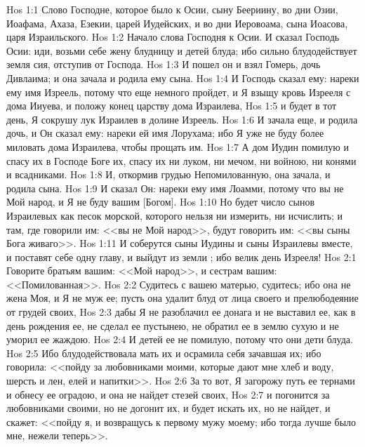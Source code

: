 \vs Hos 1:1 Слово Господне, которое было к Осии, сыну Беериину, во дни Озии, Иоафама, Ахаза, Езекии, царей Иудейских, и во дни Иеровоама, сына Иоасова, царя Израильского.
\rsbpar\vs Hos 1:2 Начало слова Господня к Осии. И сказал Господь Осии: иди, возьми себе жену блудницу и детей блуда; ибо сильно блудодействует земля сия, отступив от Господа.
\vs Hos 1:3 И пошел он и взял Гомерь, дочь Дивлаима; и она зачала и родила ему сына.
\vs Hos 1:4 И Господь сказал ему: нареки ему имя Изреель, потому что еще немного пройдет, и Я взыщу кровь Изрееля с дома Ииуева, и положу конец царству дома Израилева,
\vs Hos 1:5 и будет в тот день, Я сокрушу лук Израилев в долине Изреель.
\vs Hos 1:6 И зачала еще, и родила дочь, и Он сказал ему: нареки ей имя Лорухама; ибо Я уже не буду более миловать дома Израилева, чтобы прощать им.
\vs Hos 1:7 А дом Иудин помилую и спасу их в Господе Боге их, спасу их ни луком, ни мечом, ни войною, ни конями и всадниками.
\vs Hos 1:8 И, откормив грудью Непомилованную, она зачала, и родила сына.
\vs Hos 1:9 И сказал Он: нареки ему имя Лоамми, потому что вы не Мой народ, и Я не буду вашим [Богом].
\vs Hos 1:10 Но будет число сынов Израилевых как песок морской, которого нельзя ни измерить, ни исчислить; и там, где говорили им: <<вы не Мой народ>>, будут говорить им: <<вы сыны Бога живаго>>.
\vs Hos 1:11 И соберутся сыны Иудины и сыны Израилевы вместе, и поставят себе одну главу, и выйдут из земли ; ибо велик день Изрееля!
\vs Hos 2:1 Говорите братьям вашим: <<Мой народ>>, и сестрам вашим: <<Помилованная>>.
\vs Hos 2:2 Судитесь с вашею матерью, судитесь; ибо она не жена Моя, и Я не муж ее; пусть она удалит блуд от лица своего и прелюбодеяние от грудей своих,
\vs Hos 2:3 дабы Я не разоблачил ее донага и не выставил ее, как в день рождения ее, не сделал ее пустынею, не обратил ее в землю сухую и не уморил ее жаждою.
\vs Hos 2:4 И детей ее не помилую, потому что они дети блуда.
\vs Hos 2:5 Ибо блудодействовала мать их и осрамила себя зачавшая их; ибо говорила: <<пойду за любовниками моими, которые дают мне хлеб и воду, шерсть и лен, елей и напитки>>.
\vs Hos 2:6 За то вот, Я загорожу путь ее тернами и обнесу ее оградою, и она не найдет стезей своих,
\vs Hos 2:7 и погонится за любовниками своими, но не догонит их, и будет искать их, но не найдет, и скажет: <<пойду я, и возвращусь к первому мужу моему; ибо тогда лучше было мне, нежели теперь>>.
